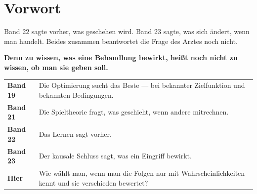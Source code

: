 \chapter*{Vorwort}

\begin{merksatz}
Band 22 sagte vorher, was geschehen wird. Band 23 sagte, was sich ändert, wenn man handelt. Beides zusammen beantwortet die Frage des Arztes noch nicht.

\begin{center}
\begin{minipage}{0.9\textwidth}
\textbf{Denn zu wissen, was eine Behandlung bewirkt, heißt noch nicht zu wissen, ob man sie geben soll.}
\end{minipage}
\end{center}

\begin{center}
\begin{minipage}{0.88\textwidth}
\end{minipage}
\end{center}
\end{merksatz}

\begin{merksatz}
\begin{center}
{\small
\renewcommand{\arraystretch}{1.52}
\begin{tabular}{@{}P{2.2cm}P{6.4cm}@{}}
\toprule
\textbf{Band 19} & Die Optimierung sucht das Beste --- bei bekannter Zielfunktion und bekannten Bedingungen.\\
\textbf{Band 21} & Die Spieltheorie fragt, was geschieht, wenn andere mitrechnen.\\
\textbf{Band 22} & Das Lernen sagt vorher.\\
\textbf{Band 23} & Der kausale Schluss sagt, was ein Eingriff bewirkt.\\
\textbf{Hier} & Wie wählt man, wenn man die Folgen nur mit Wahrscheinlichkeiten kennt und sie verschieden bewertet?\\
\bottomrule
\end{tabular}}
\end{center}

\begin{center}
\begin{minipage}{0.88\textwidth}
\end{minipage}
\end{center}
\end{merksatz}

